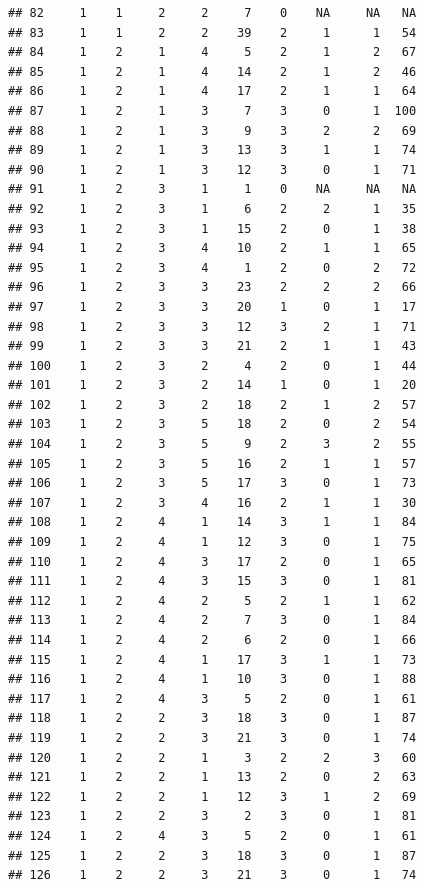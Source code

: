 \documentclass[krantz2,ChapterTOCs]{krantz}\usepackage{knitr}
\begin{document}
\begin{knitrout}
\begin{kframe}
\begin{verbatim}
## 82     1    1     2     2     7    0    NA     NA   NA
## 83     1    1     2     2    39    2     1      1   54
## 84     1    2     1     4     5    2     1      2   67
## 85     1    2     1     4    14    2     1      2   46
## 86     1    2     1     4    17    2     1      1   64
## 87     1    2     1     3     7    3     0      1  100
## 88     1    2     1     3     9    3     2      2   69
## 89     1    2     1     3    13    3     1      1   74
## 90     1    2     1     3    12    3     0      1   71
## 91     1    2     3     1     1    0    NA     NA   NA
## 92     1    2     3     1     6    2     2      1   35
## 93     1    2     3     1    15    2     0      1   38
## 94     1    2     3     4    10    2     1      1   65
## 95     1    2     3     4     1    2     0      2   72
## 96     1    2     3     3    23    2     2      2   66
## 97     1    2     3     3    20    1     0      1   17
## 98     1    2     3     3    12    3     2      1   71
## 99     1    2     3     3    21    2     1      1   43
## 100    1    2     3     2     4    2     0      1   44
## 101    1    2     3     2    14    1     0      1   20
## 102    1    2     3     2    18    2     1      2   57
## 103    1    2     3     5    18    2     0      2   54
## 104    1    2     3     5     9    2     3      2   55
## 105    1    2     3     5    16    2     1      1   57
## 106    1    2     3     5    17    3     0      1   73
## 107    1    2     3     4    16    2     1      1   30
## 108    1    2     4     1    14    3     1      1   84
## 109    1    2     4     1    12    3     0      1   75
## 110    1    2     4     3    17    2     0      1   65
## 111    1    2     4     3    15    3     0      1   81
## 112    1    2     4     2     5    2     1      1   62
## 113    1    2     4     2     7    3     0      1   84
## 114    1    2     4     2     6    2     0      1   66
## 115    1    2     4     1    17    3     1      1   73
## 116    1    2     4     1    10    3     0      1   88
## 117    1    2     4     3     5    2     0      1   61
## 118    1    2     2     3    18    3     0      1   87
## 119    1    2     2     3    21    3     0      1   74
## 120    1    2     2     1     3    2     2      3   60
## 121    1    2     2     1    13    2     0      2   63
## 122    1    2     2     1    12    3     1      2   69
## 123    1    2     2     3     2    3     0      1   81
## 124    1    2     4     3     5    2     0      1   61
## 125    1    2     2     3    18    3     0      1   87
## 126    1    2     2     3    21    3     0      1   74

\end{verbatim}
\end{kframe}
\end{knitrout}
\end{document}
